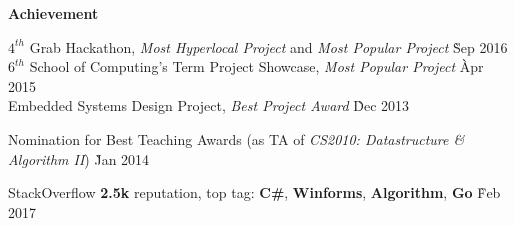 \documentclass{article}
\begin{document}
\centerline {\Large \bf Achievement}

\medskip

\begin{tabbing}
\hspace{12pt} \textbullet \hspace{3pt} {$4^{th}$} Grab Hackathon, {\it Most Hyperlocal Project} and {\it Most Popular Project} \` Sep 2016 \\
\hspace{12pt} \textbullet \hspace{3pt} {$6^{th}$} School of Computing's Term Project Showcase, {\it Most Popular Project} \` Apr 2015 \\
\hspace{12pt} \textbullet \hspace{3pt} Embedded Systems Design Project, {\it Best Project Award} \` Dec 2013 \\
\end{tabbing}\vspace{-18pt}

\begin{tabbing}
\hspace{12pt} \textbullet \hspace{3pt} Nomination for Best Teaching Awards (as TA of {\it CS2010: Datastructure \& Algorithm II}) \` Jan 2014 \\
\end{tabbing}\vspace{-18pt}

\begin{tabbing}
\hspace{12pt} \textbullet \hspace{3pt} StackOverflow {\bf 2.5k} reputation, top tag: {\bf C\#}, {\bf Winforms}, {\bf Algorithm}, {\bf Go} \` Feb 2017 \\
\end{tabbing}\vspace{-18pt}
\end{document}
